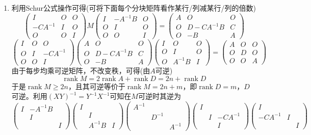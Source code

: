\documentclass[a4paper,UTF8,fontset=windows]{ctexart}
\DeclareMathOperator{\rank}{rank}
\begin{document}
\begin{enumerate}
\begin{enumerate}
        \item
        利用Schur公式操作可得(可将下面每个分块矩阵看作某行/列减某行/列的倍数)
        $$\begin{pmatrix}I&O&O\\-CA^{-1}&I&O\\O&O&I\end{pmatrix}M\begin{pmatrix}I&-A^{-1}B&O\\O&I&O\\O&O&I\end{pmatrix}=\begin{pmatrix}A&O&O\\O&D-CA^{-1}B&C\\O&-B&A\end{pmatrix}$$
        $$\begin{pmatrix}I&O&O\\O&I&-CA^{-1}\\O&O&I\end{pmatrix}\begin{pmatrix}A&O&O\\O&D-CA^{-1}B&C\\O&-B&A\end{pmatrix}\begin{pmatrix}I&O&O\\O&I&O\\O&A^{-1}B&I\end{pmatrix}=\begin{pmatrix}A&O&O\\O&D&O\\O&O&A\end{pmatrix}$$
        由于每步均乘可逆矩阵，不改变秩，可得(由$A$可逆)
        $$\rank M=2\rank A+\rank D=2n+\rank D$$
        于是$\rank M\ge2n$，且其可逆等价于$\rank M=2n+m$，即$\rank D=m$，$D$可逆。利用$(XY)^{-1}=Y^{-1}X^{-1}$可知在$M$可逆时其逆为
        $$\begin{pmatrix}I&-A^{-1}B&\\ &I&\\ &&I\end{pmatrix}\begin{pmatrix}I&&\\ &I&\\ &A^{-1}B&I\end{pmatrix}\begin{pmatrix}A^{-1}&&\\ &D^{-1}&\\&&A^{-1}\end{pmatrix}\begin{pmatrix}I&&\\ &I&-CA^{-1}\\ &&I\end{pmatrix}\begin{pmatrix}I&&\\-CA^{-1}&I&\\ &&I\end{pmatrix}$$
    \end{enumerate}


\end{enumerate}
\end{document}
